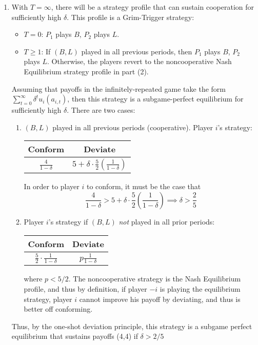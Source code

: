 \documentclass[11pt]{article}
\begin{document}
\begin{enumerate}
\begin{enumerate}
		\item With $ T = \infty $, there will be a strategy profile that can sustain cooperation for sufficiently high $ \delta $. This profile is a Grim-Trigger strategy:
		\begin{itemize}
			\item $ T = 0 $: $ P_1 $ plays $ B $, $ P_2 $ plays $ L $. 
			\item $ T\geq 1 $: If $ (B,L) $ played in all previous periods, then $ P_1 $ plays $ B $, $ P_2 $ plays $ L $. Otherwise, the players revert to the noncooperative Nash Equilibrium strategy profile in part (2). 
		\end{itemize}
	
		Assuming that payoffs in the infinitely-repeated game take the form $ \sum_{t = 0}^\infty \delta^t u_i(a_{i,t}) $, then this strategy is a subgame-perfect equilibrium for sufficiently high $\delta$. There are two cases:
		\begin{enumerate}[label = \roman{*})]
			\item $ (B, L) $ played in all previous periods (cooperative). Player $ i $'s strategy:
			\begin{table}[!h]
				\centering
				\begin{tabular}{c|c}
					Conform & Deviate \\ \hline
					$ \frac{4}{1 - \delta} $ & $ 5 + \delta \cdot \frac{5}{2} \left(\frac{1}{1 - \delta}\right) $
				\end{tabular}
			\end{table}
			In order to player $ i $ to conform, it must be the case that
			\[ \frac{4}{1 - \delta} > 5 + \delta \cdot \frac{5}{2} \left(\frac{1}{1 - \delta}\right) \implies \delta > \frac{2}{5}\]
			
		
			\item Player $ i $'s strategy if $ (B,L) $ \emph{not} played in all prior periods:
			\begin{table}[!h]
				\centering
				\begin{tabular}{c|c}
					Conform & Deviate \\ \hline
					$ \frac{5}{2}\cdot\frac{1}{1 - \delta} $ & $ p\frac{1}{1 - \delta} $
				\end{tabular}
			\end{table}
		
		where $ p < 5/2 $. The noncooperative strategy is the Nash Equilibrium profile, and thus by definition, if player $ -i $ is playing the equilibrium strategy, player $ i $ cannot improve his payoff by deviating, and thus is better off conforming.
		\end{enumerate}
		
		Thus, by the one-shot deviation principle, this strategy is a subgame perfect equilibrium that sustains payoffs (4,4) if $ \delta > 2/5 $
		\end{enumerate}
\end{enumerate}
\end{document}
